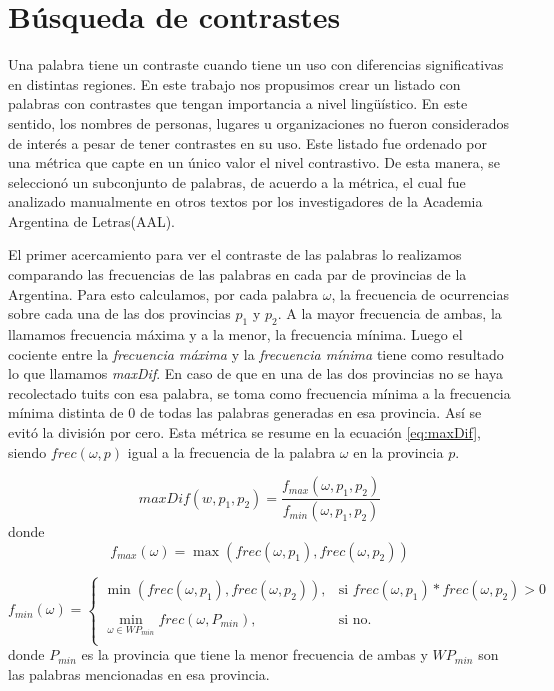 \section{Búsqueda de contrastes}

Una palabra tiene un contraste cuando tiene un uso con diferencias significativas en
distintas regiones. En este trabajo nos propusimos crear un listado con palabras con contrastes que tengan
importancia a nivel lingüístico. En este sentido, los nombres de personas, lugares u organizaciones no 
fueron considerados de interés a pesar de tener contrastes en su uso.
Este listado fue ordenado por una métrica que capte en un único valor el nivel contrastivo. De esta manera, 
se seleccionó un subconjunto de palabras, de acuerdo a la métrica, el cual fue analizado manualmente en otros textos por los investigadores de la Academia Argentina de Letras(AAL).

El primer acercamiento para ver el contraste de las palabras lo realizamos comparando las frecuencias de las palabras 
en cada par de provincias de la Argentina. Para esto calculamos, por cada palabra $\omega$, la frecuencia de ocurrencias sobre cada una de las dos provincias $p_1$ y $p_2$. A la mayor frecuencia de ambas, la llamamos frecuencia máxima y a la menor, la frecuencia mínima. Luego el cociente entre la \textit{frecuencia máxima} y la \textit{frecuencia mínima} tiene como resultado lo que llamamos \textit{maxDif}. En caso de que en una de las dos provincias no se haya 
recolectado tuits con esa palabra, se toma como frecuencia mínima a la frecuencia mínima distinta de 0 de todas las palabras generadas en esa provincia. Así se evitó la división por cero. Esta métrica se resume en la ecuación \ref{eq:maxDif}, siendo $frec(\omega,p)$ igual a la frecuencia de la palabra $\omega$ en la provincia $p$.


\begin{equation}
  \label{eq:maxDif} 
  maxDif(w,p_1,p_2) = \frac{f_{max}(\omega,p_1,p_2)}{f_{min}(\omega,p_1,p_2)}
\end{equation}
donde 
\begin{equation}
f_{max}(\omega) = \max (frec(\omega,p_1),frec(\omega,p_2))
\end{equation}

\begin{equation}
 f_{min}(\omega) = \left\{ \begin{array}{lll}
             \min \left(frec\left(\omega,p_1\right),frec\left(\omega,p_2\right)\right), & \text{si } frec(\omega,p_1) * frec(\omega,p_2) > 0  & \\
             \\
             \min\limits_{\omega \in WP_{min}} frec\left(\omega,P_{min}\right) , &  \text{si no.} &  \\
             \end{array}
   \right.
\end{equation}
   donde $P_{min}$ es la provincia que tiene la menor frecuencia de ambas y $WP_{min}$ son las palabras mencionadas en esa provincia.




